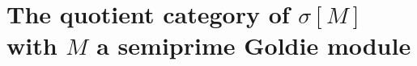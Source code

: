 \documentclass{amsart}
\newtheorem{prop}[thm]{Proposition}
\theoremstyle{definition}
\theoremstyle{remark}
\numberwithin{equation}{section}
\DeclareMathOperator{\Sat}{Sat}
\newcommand{\sm}{\sigma[M]}
\newcommand{\ess}{\leq^\text{ess}}
\begin{document}
	
	
	\section[The quotient category]{The quotient category of $\sigma [M]$ 
		with $M$ a semiprime Goldie module}\label{qcsgm}
	
\end{document}
